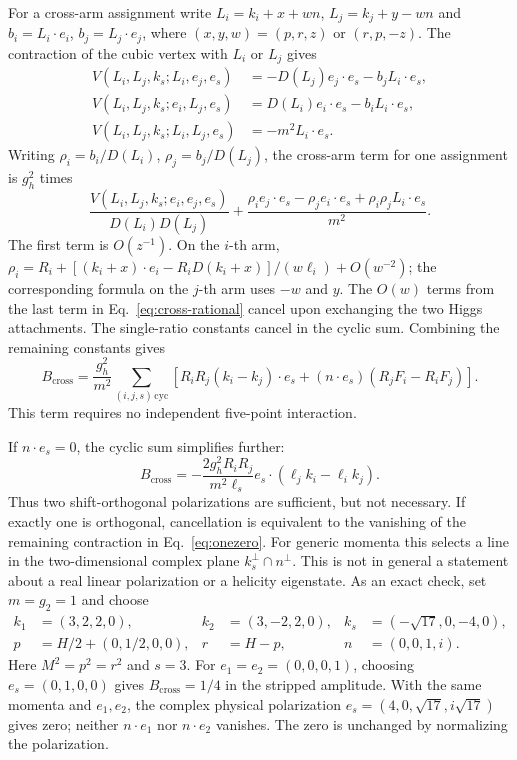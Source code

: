 \documentclass[11pt,a4paper]{article}
\begin{document}
For a cross-arm assignment write
\(L_i=k_i+x+wn\), \(L_j=k_j+y-wn\) and \(b_i=L_i\cdot e_i\),
\(b_j=L_j\cdot e_j\), where \((x,y,w)=(p,r,z)\) or \((r,p,-z)\).
The contraction of the cubic vertex with \(L_i\) or \(L_j\) gives
\begin{align}
 V(L_i,L_j,k_s;L_i,e_j,e_s)
   &=-D(L_j)e_j\cdot e_s-b_jL_i\cdot e_s,\\
 V(L_i,L_j,k_s;e_i,L_j,e_s)
   &= D(L_i)e_i\cdot e_s-b_iL_i\cdot e_s,\\
 V(L_i,L_j,k_s;L_i,L_j,e_s)&=-m^2L_i\cdot e_s .
 \label{eq:ward}
\end{align}
Writing \(\rho_i=b_i/D(L_i)\), \(\rho_j=b_j/D(L_j)\), the
cross-arm term for one assignment is \(g_h^2\) times
\begin{equation}
 \frac{V(L_i,L_j,k_s;e_i,e_j,e_s)}{D(L_i)D(L_j)}
 +\frac{\rho_i e_j\cdot e_s-\rho_j e_i\cdot e_s
            +\rho_i\rho_j L_i\cdot e_s}{m^2}.
 \label{eq:cross-rational}
\end{equation}
The first term is \(O(z^{-1})\). On the \(i\)-th arm,
\(\rho_i=R_i+[(k_i+x)\cdot e_i-R_i D(k_i+x)]/(w\ell_i)+O(w^{-2})\);
the corresponding formula on the \(j\)-th arm uses \(-w\) and \(y\).
The \(O(w)\) terms from the last term in Eq.~\eqref{eq:cross-rational}
cancel upon exchanging the two Higgs attachments. The single-ratio
constants cancel in the cyclic sum. Combining the remaining constants
gives
\begin{equation}
 B_{\mathrm{cross}}=\frac{g_h^2}{m^2}
 \sum_{(i,j,s)\,\mathrm{cyc}}\!
 \left[R_iR_j(k_i-k_j)\cdot e_s+
        (n\cdot e_s)(R_jF_i-R_iF_j)\right].
 \label{eq:cross}
\end{equation}
This term requires no independent five-point interaction.

If \(n\cdot e_s=0\), the cyclic sum simplifies further:
\begin{equation}
 B_{\mathrm{cross}}=
 -\frac{2g_h^2 R_iR_j}{m^2\ell_s}
  e_s\cdot (\ell_j k_i-\ell_i k_j).
 \label{eq:onezero}
\end{equation}
Thus two shift-orthogonal polarizations are sufficient, but not
necessary. If exactly one is orthogonal, cancellation is equivalent
to the vanishing of the remaining contraction in Eq.~\eqref{eq:onezero}.
For generic momenta this selects a line in the two-dimensional
complex plane \(k_s^\perp\cap n^\perp\). This is not in general a
statement about a real linear polarization or a helicity eigenstate. As an exact check, set
\(m=g_2=1\) and choose
\[
\begin{aligned}
 k_1&=(3,2,2,0), & k_2&=(3,-2,2,0), &
 k_s&=(-\sqrt{17},0,-4,0),\\
 p&=H/2+(0,1/2,0,0), & r&=H-p, & n&=(0,0,1,i).
\end{aligned}
\]
Here \(M^2=p^2=r^2\) and \(s=3\).
For \(e_1=e_2=(0,0,0,1)\), choosing \(e_s=(0,1,0,0)\)
gives \(B_{\mathrm{cross}}=1/4\) in the stripped amplitude.
With the same momenta and \(e_1,e_2\), the complex physical
polarization \(e_s=(4,0,\sqrt{17},i\sqrt{17})\) gives zero;
neither \(n\cdot e_1\) nor \(n\cdot e_2\) vanishes.
The zero is unchanged by normalizing the polarization.
\end{document}
